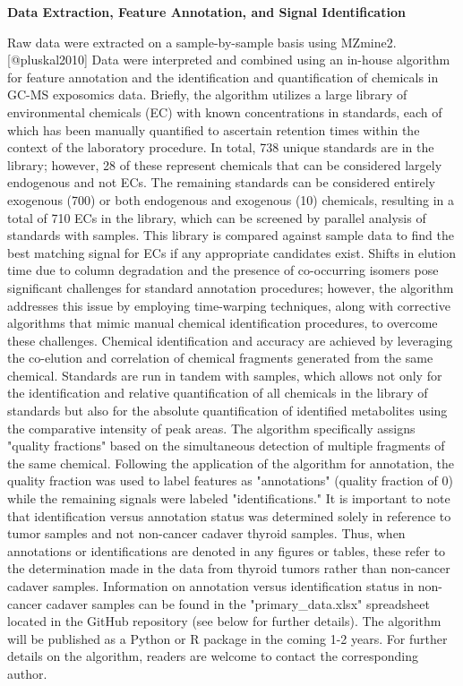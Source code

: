 \noindent\textbf{Data Extraction, Feature Annotation, and Signal Identification}

Raw data were extracted on a sample-by-sample basis using MZmine2.[@pluskal2010] Data were interpreted and combined using an in-house algorithm for feature annotation and the identification and quantification of chemicals in GC-MS exposomics data. 
Briefly, the algorithm utilizes a large library of environmental chemicals (EC) with known concentrations in standards, each of which has been manually quantified to ascertain retention times within the context of the laboratory procedure. 
In total, 738 unique standards are in the library; however, 28 of these represent chemicals that can be considered largely endogenous and not ECs. 
The remaining standards can be considered entirely exogenous (700) or both endogenous and exogenous (10) chemicals, resulting in a total of 710 ECs in the library, which can be screened by parallel analysis of standards with samples. 
This library is compared against sample data to find the best matching signal for ECs if any appropriate candidates exist. 
Shifts in elution time due to column degradation and the presence of co-occurring isomers pose significant challenges for standard annotation procedures; however, the algorithm addresses this issue by employing time-warping techniques, along with corrective algorithms that mimic manual chemical identification procedures, to overcome these challenges. 
Chemical identification and accuracy are achieved by leveraging the co-elution and correlation of chemical fragments generated from the same chemical. 
Standards are run in tandem with samples, which allows not only for the identification and relative quantification of all chemicals in the library of standards but also for the absolute quantification of identified metabolites using the comparative intensity of peak areas. 
The algorithm specifically assigns "quality fractions" based on the simultaneous detection of multiple fragments of the same chemical. 
Following the application of the algorithm for annotation, the quality fraction was used to label features as "annotations" (quality fraction of 0) while the remaining signals were labeled "identifications." 
It is important to note that identification versus annotation status was determined solely in reference to tumor samples and not non-cancer cadaver thyroid samples. 
Thus, when annotations or identifications are denoted in any figures or tables, these refer to the determination made in the data from thyroid tumors rather than non-cancer cadaver samples. 
Information on annotation versus identification status in non-cancer cadaver samples can be found in the "primary\_data.xlsx" spreadsheet located in the GitHub repository (see below for further details). 
The algorithm will be published as a Python or R package in the coming 1-2 years. 
For further details on the algorithm, readers are welcome to contact the corresponding author.

